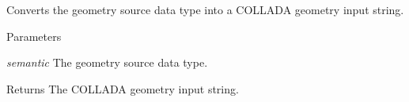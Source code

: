 \label{namespaceFUDaeGeometryInput_a782866990c13f5b71e2927efb80e61b6}
Converts the geometry source data type into a COLLADA geometry input string. 
\begin{DoxyParams}{Parameters}
\item[{\em semantic}]The geometry source data type. \end{DoxyParams}
\begin{DoxyReturn}{Returns}
The COLLADA geometry input string. 
\end{DoxyReturn}
